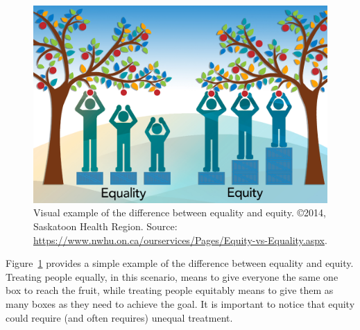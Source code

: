 \begin{figure}[t!]
\includegraphics[scale=.5]{figures/equality_vs_equity.jpg}
\centering
\caption{Visual example of the difference between equality and equity.\newline
\copyright 2014, Saskatoon Health Region. Source: \upshape\protect\url{https://www.nwhu.on.ca/ourservices/Pages/Equity-vs-Equality.aspx}.}
\label{fig:equality_vs_equity}
\end{figure}

Figure~\ref{fig:equality_vs_equity} provides a simple example of the difference between equality and equity. Treating people equally, in this scenario, means to give everyone the same one box to reach the fruit, while treating people equitably means to give them as many boxes as they need to achieve the goal. It is important to notice that equity could require (and often requires) unequal treatment.


